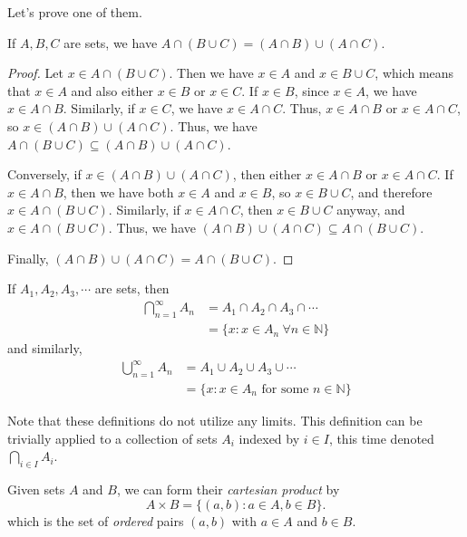 \documentclass[12pt]{article}
\begin{document}
Let's prove one of them.
\begin{theorem}
    If $A,B,C$ are sets, we have $A \cap (B \cup C) = (A \cap B) \cup (A \cap C)$.
\end{theorem}
\begin{proof}
    Let $x \in A \cap (B \cup C)$.
    Then we have $x \in A$ and $x \in B \cup C$,
    which means that $x \in A$ and also either $x \in B$ or $x \in C$.
    If $x \in B$, since $x \in A$, we have $x \in A \cap B$.
    Similarly, if $x \in C$, we have $x \in A \cap C$.
    Thus, $x \in A \cap B$ or $x \in A \cap C$, so $x \in (A \cap B) \cup (A \cap C)$.
    Thus, we have $A \cap (B \cup C) \subseteq (A \cap B) \cup (A \cap C)$.

    Conversely, if $x \in (A \cap B) \cup (A \cap C)$,
    then either $x \in A \cap B$ or $x \in A \cap C$.
    If $x \in A \cap B$, then we have both $x \in A$ and $x \in B$,
    so $x \in B \cup C$, and therefore $x \in A \cap (B \cup C)$.
    Similarly, if $x \in A \cap C$, then
    $x \in B \cup C$ anyway, and $x \in A \cap (B \cup C)$.
    Thus, we have $(A \cap B) \cup (A \cap C) \subseteq A \cap (B \cup C)$.

    Finally, $(A \cap B) \cup (A \cap C) = A \cap (B \cup C)$.
\end{proof}

\begin{definition}
    If $A_{1},A_{2},A_{3},\cdots$ are sets, then
    \begin{align*}
        \bigcap_{n=1}^{\infty} A_n &= A_{1} \cap A_{2} \cap A_{3} \cap \cdots\\
                                   &= \{x : x \in A_n \ \forall n \in \mathbb{N}\}
    \end{align*}
    and similarly,
    \begin{align*}
        \bigcup_{n=1}^{\infty} A_n &= A_{1} \cup A_{2} \cup A_{3} \cup \cdots\\
                                  &= \{x : x \in A_n \text{ for some } n \in \mathbb{N}\}
    \end{align*}
\end{definition}
Note that these definitions do not utilize any limits.
This definition can be trivially applied to
a collection of sets $A_i$ indexed by $i \in I$,
this time denoted $\bigcap\limits_{i \in I} A_i$.

\begin{definition}
    Given sets $A$ and $B$, we can form their \emph{cartesian product} by
    \[
        A \times B = \{(a,b) : a \in A, b \in B\}.
    \]
    which is the set of \emph{ordered} pairs $(a,b)$ with $a \in A$ and $b \in B$.
\end{definition}
\end{document}
